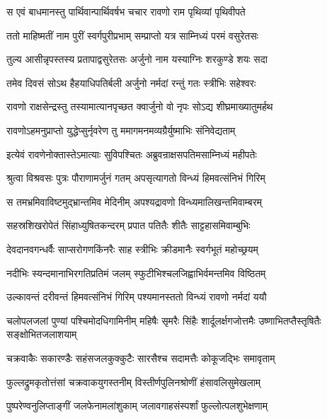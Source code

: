 \twolineshloka
{स एवं बाधमानस्तु पार्थिवान्पार्थिवर्षभ}
{चचार रावणो राम पृथिव्यां पृथिवीपते} %

\twolineshloka
{ततो माहिष्मतीं नाम पुरीं स्वर्गपुरीप्रभाम्}
{सम्प्राप्तो यत्र साम्निध्यं परमं वसुरेतसः} %

\twolineshloka
{तुल्य आसीन्नृपस्तस्य प्रतापाद्वसुरेतसः}
{अर्जुनो नाम यस्याग्निः शरकुण्डे शयः सदा} %

\twolineshloka
{तमेव दिवसं सोऽथ हैहयाधिपतिर्बली}
{अर्जुनो नर्मदां रन्तुं गतः स्त्रीभिः सहेश्वरः} %

\twolineshloka
{रावणो राक्षसेन्द्रस्तु तस्यामात्यानपृच्छत}
{क्वार्जुनो वो नृपः सोऽद्य शीघ्रमाख्यातुमर्हथ} %

\twolineshloka
{रावणोऽहमनुप्राप्तो युद्धेप्सुर्नृवरेण तु}
{ममागमनमव्यग्रैर्युष्माभिः संनिवेद्यताम्} %

\twolineshloka
{इत्येवं रावणेनोक्तास्तेऽमात्याः सुविपश्चितः}
{अब्रुवन्राक्षसपतिमसाम्निध्यं महीपतेः} %

\twolineshloka
{श्रुत्वा विश्रवसः पुत्रः पौराणामर्जुनं गतम्}
{अपसृत्यागतो विन्ध्यं हिमवत्संनिभं गिरिम्} %

\twolineshloka
{स तमभ्रमिवाविष्टमुद्भ्रान्तमिव मेदिनीम्}
{अपश्यद्रावणो विन्ध्यमालिखन्तमिवाम्बरम्} %

\twolineshloka
{सहस्रशिखरोपेतं सिंहाध्युषितकन्दरम्}
{प्रपात पतितैः शीतैः साट्टहासमिवाम्बुभिः} %

\twolineshloka
{देवदानवगन्धर्वैः साप्सरोगणकिंनरैः}
{साह स्त्रीभिः क्रीडमानैः स्वर्गभूतं महोच्छ्रयम्} %

\twolineshloka
{नदीभिः स्यन्दमानाभिरगतिप्रतिमं जलम्}
{स्फुटीभिश्चलजिह्वाभिर्वमन्तमिव विष्ठितम्} %

\twolineshloka
{उल्कावन्तं दरीवन्तं हिमवत्संनिभं गिरिम्}
{पश्यमानस्ततो विन्ध्यं रावणो नर्मदां ययौ} %

\threelineshloka
{चलोपलजलां पुण्यां पश्चिमोदधिगामिनीम्}
{महिषैः सृमरैः सिंहैः शार्दूलर्क्षगजोत्तमैः}
{उष्णाभितप्तैस्तृषितैः सङ्क्षोभितजलाशयाम्} %

\twolineshloka
{चक्रवाकैः सकारण्डैः सहंसजलकुक्कुटैः}
{सारसैश्च सदामत्तैः कोकूजद्भिः समावृताम्} %

\twolineshloka
{फुल्लद्रुमकृतोत्तंसां चक्रवाकयुगस्तनीम्}
{विस्तीर्णपुलिनश्रोणीं हंसावलिसुमेखलाम्} %

\twolineshloka
{पुष्परेण्वनुलिप्ताङ्गीं जलफेनामलांशुकाम्}
{जलावगाहसंस्पर्शां फुल्लोत्पलशुभेक्षणाम्} %

